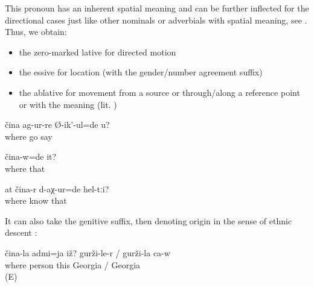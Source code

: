 This pronoun has an inherent spatial meaning and can be further inflected for the directional cases just like other nominals or adverbials with spatial meaning, see . Thus, we obtain:
%
\begin{itemize}
	\item	the zero-marked lative  for directed motion 
	\item	the essive  for location (with the gender/number agreement suffix) 
	\item	the ablative  for movement from a source or through\slash along a reference point or with the meaning  (lit. ) 
\end{itemize}
%
\begin{exe}
	\ex	\label{ex:Are you (masc.) asking where he went}
	\gll	čina	ag-ur-re	Ø-ik'-ul=de	u?\\
		where	go	say	\\
	\glt	{}

	\ex	\label{ex:Where was he}
	\gll	čina-w=de	it?\\
		where	that\\
	\glt	{}

	\ex	\label{ex:How did you get to know them (= the medical plants)}
	\gll	at	čina-r	d-aχ-ur=de	hel-tːi?\\
			where	know	that\\
	\glt	{}
\end{exe}

It can also take the genitive suffix, then denoting origin in the sense of ethnic descent :
%
\begin{exe}
	\ex	\label{ex:Where is this person from? (He) is from Georgia (i.e. he is Georgian)}
	\gll	čina-la	admi=ja	iž?	gurži-le-r	/	gurži-la	ca-w\\
		where	person	this	Georgia	/	Georgia	\\
	\glt	{} (E)
\end{exe}


